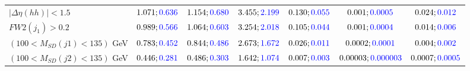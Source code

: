 \begin{landscape}
\begin{table}
\begin{tabular}{lcccccc}
				\rowcolor{black!7}$|\Delta\eta(hh)|<1.5$& $1.071;\textcolor{blue}{0.636}$&$1.154;\textcolor{blue}{0.680}$ &$3.455;\textcolor{blue}{2.199}$ &$0.130;\textcolor{blue}{0.055}$ &$0.001;\textcolor{blue}{0.0005}$ &$0.024;\textcolor{blue}{0.012}$\\
				$FW2(j_1)>0.2$ &$0.989;\textcolor{blue}{0.566}$ &$1.064;\textcolor{blue}{0.603}$&$3.254;\textcolor{blue}{2.018}$&$0.105;\textcolor{blue}{0.044}$&$0.001;\textcolor{blue}{0.0004}$&$0.014;\textcolor{blue}{0.006}$\\
				\rowcolor{black!7}$(100<M_{SD}(j1)<135)$ GeV& $0.783;\textcolor{blue}{0.452}$&$0.844;\textcolor{blue}{0.486}$&$2.673;\textcolor{blue}{1.672}$&$0.026;\textcolor{blue}{0.011}$&$0.0002;\textcolor{blue}{0.0001}$&$0.004;\textcolor{blue}{0.002}$\\
				$(100<M_{SD}(j2)<135)$ GeV &$0.446;\textcolor{blue}{0.281}$ &$0.486;\textcolor{blue}{0.303}$ &$1.642;\textcolor{blue}{1.074}$&$0.007;\textcolor{blue}{0.003}$&$0.00003;\textcolor{blue}{0.000003}$&$0.0007;\textcolor{blue}{0.0005}$\\
				\bottomrule
			\end{tabular}
		\end{table}
		

\end{landscape}
